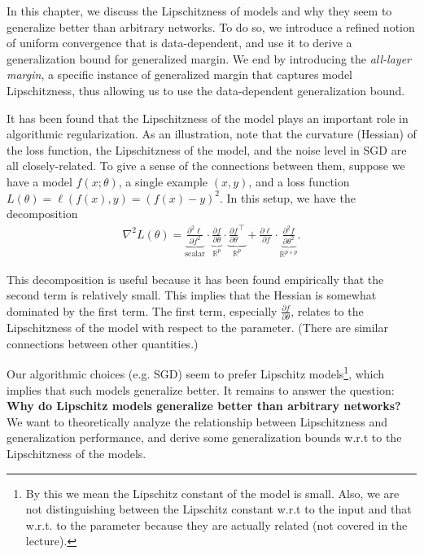 \setcounter{section}{0}



In this chapter, we discuss the Lipschitzness of models and why they seem to generalize better than arbitrary networks. To do so, we introduce a refined notion of uniform convergence that is data-dependent, and use it to derive a generalization bound for generalized margin. We end by introducing the \textit{all-layer margin}, a specific instance of generalized margin that captures model Lipschitzness, thus allowing us to use the data-dependent generalization bound.

It has been found that the Lipschitzness of the model plays an important role in algorithmic regularization. As an illustration, note that the curvature (Hessian) of the loss function, the Lipschitzness of the model, and the noise level in SGD are all closely-related. To give a sense of the connections between them, suppose we have a model $f(x; \theta)$, a single example $(x, y)$, and a loss function $L(\theta) = \ell (f(x), y) = (f(x) - y)^2$. In this setup, we have the decomposition
\begin{align}
\nabla^2 L(\theta) = \underbrace{{\frac{\partial^2 \ell}{\partial f^2}}}_{\text{scalar}} \cdot \underbrace{\frac{\partial f}{\partial \theta}}_{\mathbb{R}^p} \cdot \underbrace{\frac{\partial f}{\partial \theta}^\top}_{\mathbb{R}^p} + \frac{\partial \ell}{\partial f} \cdot  \underbrace{\frac{\partial^2 f}{\partial \theta^2}}_{\mathbb{R}^{p\times p}}.
\end{align}

This decomposition is useful because it has been found empirically that the second term is relatively small. This implies that the Hessian is somewhat dominated by the first term. The first term, especially $\frac{\partial  f}{\partial \theta}$, relates to the Lipschitzness of the model with respect to the parameter. (There are similar connections between other quantities.)

Our algorithmic choices (e.g. SGD) seem to prefer Lipschitz models\footnote{By this we mean the Lipschitz constant of the model is small. Also, we are not distinguishing between the Lipschitz constant w.r.t to the input and that w.r.t. to the parameter because they are actually related (not covered in the lecture).}, which implies that such models generalize better. It remains to answer the question: \textbf{Why do Lipschitz models generalize better than arbitrary networks?} We want to theoretically analyze the relationship between Lipschitzness and generalization performance, and derive some generalization bounds w.r.t to the Lipschitzness of the models.

